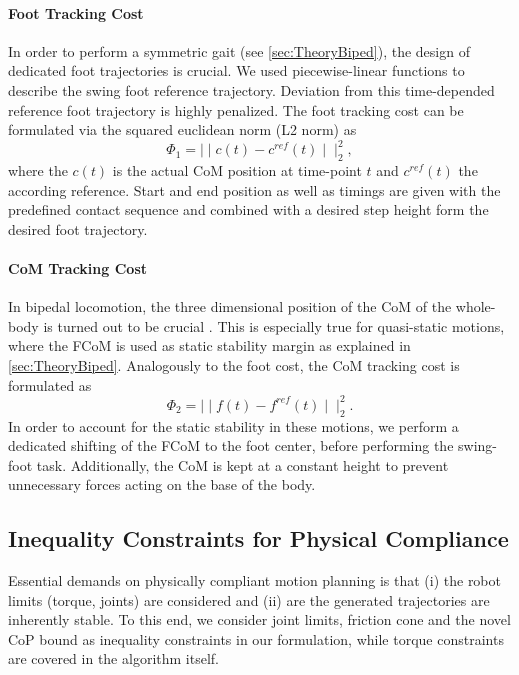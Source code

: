 \paragraph{Foot Tracking Cost}
In order to perform a symmetric gait (see \cref{sec:TheoryBiped}), the design of dedicated foot trajectories is crucial. We used piecewise-linear functions to describe the swing foot reference trajectory. Deviation from this time-depended reference foot trajectory is highly penalized. The foot tracking cost can be formulated via the squared euclidean norm (L2 norm) as
\begin{equation*} 
\Phi_1=\mid\mid c(t)-c^{ref}(t)\mid\mid^2_2, 
\end{equation*}
where the $c(t)$ is the actual \gls{CoM} position at time-point $t$ and $c^{ref}(t)$ the according reference. Start and end position as well as timings are given with the predefined contact sequence and combined with a desired step height form the desired foot trajectory. 

\paragraph{\Gls{CoM} Tracking Cost}
In bipedal locomotion, the three dimensional position of the \gls{CoM} of the whole-body is turned out to be crucial \cite{carpentier2017centre}. This is especially true for quasi-static motions, where the \gls{FCoM} is used as static stability margin as explained in \cref{sec:TheoryBiped}. Analogously to the foot cost, the \gls{CoM} tracking cost is formulated as
\begin{equation*} 
\Phi_2=\mid\mid f(t)-f^{ref}(t)\mid\mid^2_2.
\end{equation*}
In order to account for the static stability in these motions, we perform a dedicated shifting of the \gls{FCoM} to the foot center, before performing the swing-foot task. Additionally, the \gls{CoM} is kept at a constant height to prevent unnecessary forces acting on the base of the body. 

\subsection{Inequality Constraints for Physical Compliance}
Essential demands on physically compliant motion planning is that (i) the robot limits (torque, joints) are considered and (ii) are the generated trajectories are inherently stable. To this end, we consider joint limits, friction cone and the novel \gls{CoP} bound as inequality constraints in our formulation, while torque constraints are covered in the algorithm itself.

